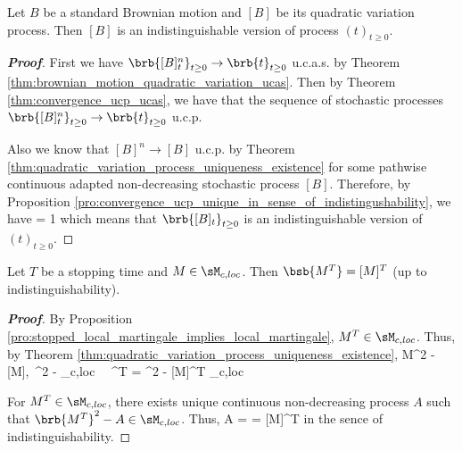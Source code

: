 \begin{corollary}
Let $B$ be a standard Brownian motion and $[B]$ be its quadratic variation process. Then $[B]$ is an indistinguishable version of process $(t)_{t\geq 0}$.
\end{corollary}

\begin{proof}[\bf Proof]
First we have $\brb{[B]^n_t}_{t\geq 0} \to \brb{t}_{t\geq 0}$ u.c.a.s. by Theorem \ref{thm:brownian_motion_quadratic_variation_ucas}. Then by Theorem \ref{thm:convergence_ucp_ucas}, we have that the sequence of stochastic processes $\brb{[B]^n_t}_{t\geq 0} \to \brb{t}_{t\geq 0}$ u.c.p.

Also we know that $[B]^n \to [B]$ u.c.p. by Theorem \ref{thm:quadratic_variation_process_uniqueness_existence} for some pathwise continuous adapted non-decreasing stochastic process $[B]$. Therefore, by Proposition \ref{pro:convergence_ucp_unique_in_sense_of_indistingushability}, we have
\be
\pro{} = 1
\ee
which means that $\brb{[B]_t}_{t\geq 0}$ is an indistinguishable version of $(t)_{t\geq 0}$.
\end{proof}



\begin{proposition}\label{pro:local_martingale_quadratic_variation_stoppting_time_in_out}
Let $T$ be a stopping time and $M \in \sM_{c,loc}$. Then $\bsb{M^T} = [M]^T$ (up to indistinguishability).
\end{proposition}

\begin{proof}[\bf Proof]
By Proposition \ref{pro:stopped_local_martingale_implies_local_martingale}, $M^T \in \sM_{c,loc}$. Thus, by Theorem \ref{thm:quadratic_variation_process_uniqueness_existence},
\be
M^2 - [M],\  ^2 -  \in \sM_{c,loc} \ \ra \ ^T = ^2 - [M]^T \in \sM_{c,loc}
\ee

For $M^T\in \sM_{c,loc}$, there exists unique continuous non-decreasing process $A$ such that $\brb{M^T}^2 - A \in \sM_{c,loc}$. Thus,
\be
A =  = [M]^T
\ee
in the sence of indistinguishability.%
\end{proof}

